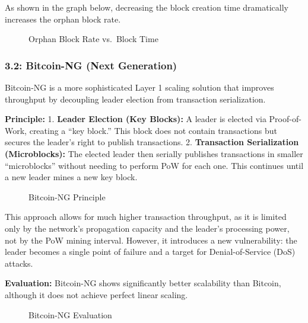 As shown in the graph below, decreasing the block creation time
dramatically increases the orphan block rate.

\begin{figure}
\centering
\caption{Orphan Block Rate vs.~Block Time}
\end{figure}

\subsubsection{3.2: Bitcoin-NG (Next
Generation)}\label{bitcoin-ng-next-generation}

Bitcoin-NG is a more sophisticated Layer 1 scaling solution that
improves throughput by decoupling leader election from transaction
serialization.

\textbf{Principle:} 1. \textbf{Leader Election (Key Blocks):} A leader
is elected via Proof-of-Work, creating a ``key block.'' This block does
not contain transactions but secures the leader's right to publish
transactions. 2. \textbf{Transaction Serialization (Microblocks):} The
elected leader then serially publishes transactions in smaller
``microblocks'' without needing to perform PoW for each one. This
continues until a new leader mines a new key block.

\begin{figure}
\centering
\caption{Bitcoin-NG Principle}
\end{figure}

This approach allows for much higher transaction throughput, as it is
limited only by the network's propagation capacity and the leader's
processing power, not by the PoW mining interval. However, it introduces
a new vulnerability: the leader becomes a single point of failure and a
target for Denial-of-Service (DoS) attacks.

\textbf{Evaluation:} Bitcoin-NG shows significantly better scalability
than Bitcoin, although it does not achieve perfect linear scaling.

\begin{figure}
\centering
\caption{Bitcoin-NG Evaluation}
\end{figure}

